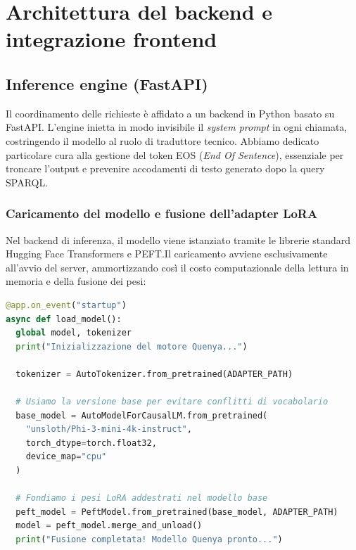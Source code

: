 \section{Architettura del backend e integrazione frontend}\label{sec:backend}

\subsection{Inference engine (FastAPI)}\label{subsec:fastapi}
Il coordinamento delle richieste è affidato a un backend in Python basato su FastAPI.\@
L'engine inietta in modo invisibile il \textit{system prompt} in ogni chiamata, costringendo il modello al ruolo di traduttore tecnico. Abbiamo dedicato particolare cura alla gestione del token EOS (\textit{End Of Sentence}), essenziale per troncare l'output e prevenire accodamenti di testo generato dopo la query SPARQL.\@

  \subsubsection{Caricamento del modello e fusione dell'adapter LoRA}

  \begin{sloppypar}
  Nel backend di inferenza, il modello viene istanziato tramite le librerie standard Hugging Face Transformers e PEFT.\@ Il caricamento avviene esclusivamente all'avvio del server, ammortizzando così il costo computazionale della lettura in memoria e della fusione dei pesi:
  \end{sloppypar}

  \begin{lstlisting}[language=python, caption=Caricamento e fusione dell'adapter LoRA all'avvio del server FastAPI]
@app.on_event("startup")
async def load_model():
  global model, tokenizer
  print("Inizializzazione del motore Quenya...")

  tokenizer = AutoTokenizer.from_pretrained(ADAPTER_PATH)

  # Usiamo la versione base per evitare conflitti di vocabolario
  base_model = AutoModelForCausalLM.from_pretrained(
    "unsloth/Phi-3-mini-4k-instruct",
    torch_dtype=torch.float32,
    device_map="cpu"
  )

  # Fondiamo i pesi LoRA addestrati nel modello base
  peft_model = PeftModel.from_pretrained(base_model, ADAPTER_PATH)
  model = peft_model.merge_and_unload()
  print("Fusione completata! Modello Quenya pronto...")
\end{lstlisting}

